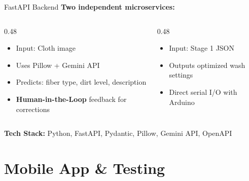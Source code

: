 \documentclass[aspectratio=169]{beamer}
\begin{document}
\begin{frame}{FastAPI Backend}
\vspace*{-0.2cm}
\textcolor{NavyBlue}{\textbf{Two independent microservices:}}
\vspace{0.1cm}

\begin{columns}[T]
\begin{column}{0.48\textwidth}
\begin{tcolorbox}[mycard, title={\faServer\enspace API 1 — Fabric Analysis \small(Port 8000)}]
\small
\begin{itemize}
  \item Input: Cloth image
  \item Uses Pillow + Gemini API
  \item Predicts: fiber type, dirt level, description
  \item \textbf{Human-in-the-Loop} feedback for corrections
\end{itemize}
\end{tcolorbox}
\end{column}
\begin{column}{0.48\textwidth}
\begin{tcolorbox}[accentcard, title={\faServer\enspace API 2 — Wash Parameter Calculator}]
\small
\begin{itemize}
  \item Input: Stage 1 JSON
  \item Outputs optimized wash settings
  \item Direct serial I/O with Arduino
\end{itemize}
\end{tcolorbox}
\end{column}
\end{columns}
\vspace{0.1cm}
\begin{tcolorbox}[infobar]
\centering\footnotesize
\textbf{\textcolor{NavyBlue}{\faCode\enspace Tech Stack:}}
Python, FastAPI, Pydantic, Pillow, Gemini API, OpenAPI
\end{tcolorbox}
\end{frame}

\section{Mobile App \& Testing}
\end{document}
